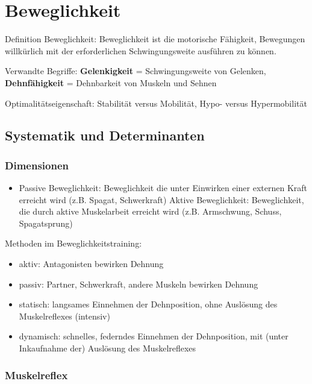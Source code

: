 
\section{Beweglichkeit}

Definition Beweglichkeit: Beweglichkeit ist die motorische Fähigkeit, Bewegungen willkürlich mit der erforderlichen Schwingungsweite ausführen zu können.

Verwandte Begriffe: \textbf{Gelenkigkeit} = Schwingungsweite von Gelenken, \textbf{Dehnfähigkeit} = Dehnbarkeit von Muskeln und Sehnen

Optimalitätseigenschaft: Stabilität versus Mobilität, Hypo- versus Hypermobilität

\subsection{Systematik und Determinanten}

\subsubsection*{Dimensionen }

\begin{itemize}
    \item Passive Beweglichkeit: Beweglichkeit die unter Einwirken einer externen Kraft erreicht wird (z.B. Spagat, Schwerkraft)
    Aktive Beweglichkeit: Beweglichkeit, die durch aktive Muskelarbeit erreicht wird (z.B. Armschwung, Schuss, Spagatsprung)
\end{itemize}

Methoden im Beweglichkeitstraining:
\begin{itemize}
    \item aktiv: Antagonisten bewirken Dehnung
    \item passiv: Partner, Schwerkraft, andere Muskeln bewirken Dehnung
    \item statisch: langsames Einnehmen der Dehnposition, ohne Auslösung des Muskelreflexes (intensiv)
    \item dynamisch: schnelles, federndes Einnehmen der Dehnposition, mit (unter Inkaufnahme der) Auslösung des Muskelreflexes
\end{itemize}

\subsubsection*{Muskelreflex}

